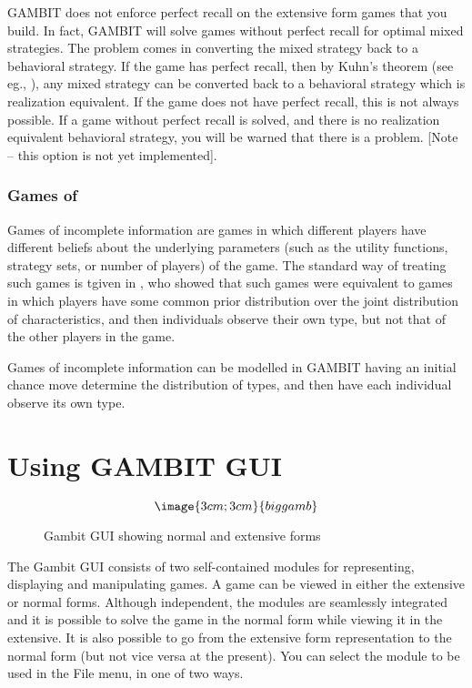 GAMBIT does not enforce perfect recall on the extensive form games that
you build.  In fact, GAMBIT will solve games without perfect recall for
 optimal
mixed strategies.  The problem comes in converting the mixed strategy back
to a behavioral strategy.  If the game has perfect recall, then by Kuhn's
theorem (see eg., \cite{vanDamme:1983}), any mixed strategy can be
converted back to a behavioral strategy which is realization equivalent.  
If the game does not have perfect recall, this is not always possible.  If
a game without perfect recall is solved, and there is no realization
equivalent behavioral strategy, you will be warned that there is a
problem. [Note -- this option is not yet implemented].  
 

\subsection{Games of }\label{incinfsec}
Games of incomplete information are games in which different players have 
different beliefs about the underlying parameters (such as the utility 
functions, strategy sets, or number of players) of the game.  The standard 
way of treating such games is tgiven in \cite{Harsanyi:1967}, who showed that
 such games were equivalent to games in which players have some common
prior distribution over the joint distribution of characteristics, and
 then individuals observe their own type, but not that of the other players 
in the game.  

Games of incomplete information can be modelled in GAMBIT having an initial 
chance move determine the distribution of types, and then have each 
individual observe its own type.    

\chapter{Using GAMBIT GUI}

\begin{figure}
$$\image{3cm;3cm}{biggamb}$$
\caption{Gambit GUI showing normal and extensive
forms}\label{fig:biggamb}
\end{figure}

The Gambit GUI consists of two self-contained modules for representing,
displaying and manipulating games.  A game can be viewed in either the
extensive or normal forms.  Although independent, the modules are
seamlessly integrated and it is possible to solve the game in the normal
form while viewing it in the extensive.  It is also possible to go from
the extensive form representation to the normal form (but not vice versa
at the present).   You can select the module to be used in the File menu,
in one of two ways.

